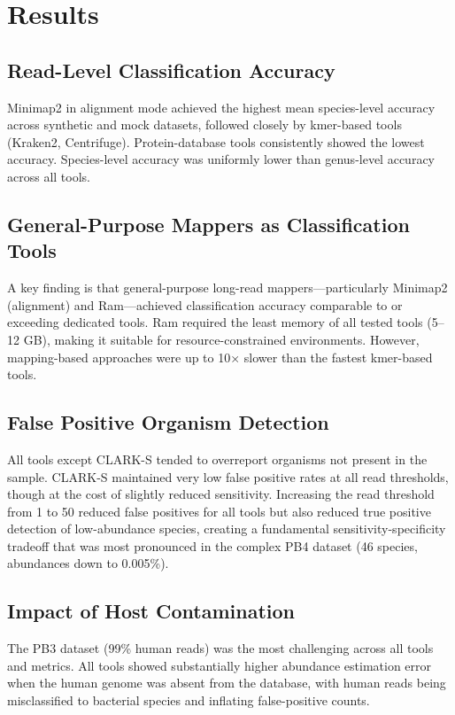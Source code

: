 \documentclass[11pt]{article}
\begin{document}
\section{Results}

\subsection{Read-Level Classification Accuracy}

Minimap2 in alignment mode achieved the highest mean species-level accuracy across synthetic and mock datasets, followed closely by kmer-based tools (Kraken2, Centrifuge). Protein-database tools consistently showed the lowest accuracy. Species-level accuracy was uniformly lower than genus-level accuracy across all tools.

\subsection{General-Purpose Mappers as Classification Tools}

A key finding is that general-purpose long-read mappers---particularly Minimap2 (alignment) and Ram---achieved classification accuracy comparable to or exceeding dedicated tools. Ram required the least memory of all tested tools (5--12 GB), making it suitable for resource-constrained environments. However, mapping-based approaches were up to 10$\times$ slower than the fastest kmer-based tools.

\subsection{False Positive Organism Detection}

All tools except CLARK-S tended to overreport organisms not present in the sample. CLARK-S maintained very low false positive rates at all read thresholds, though at the cost of slightly reduced sensitivity. Increasing the read threshold from 1 to 50 reduced false positives for all tools but also reduced true positive detection of low-abundance species, creating a fundamental sensitivity-specificity tradeoff that was most pronounced in the complex PB4 dataset (46 species, abundances down to 0.005\%).

\subsection{Impact of Host Contamination}

The PB3 dataset (99\% human reads) was the most challenging across all tools and metrics. All tools showed substantially higher abundance estimation error when the human genome was absent from the database, with human reads being misclassified to bacterial species and inflating false-positive counts.
\end{document}

